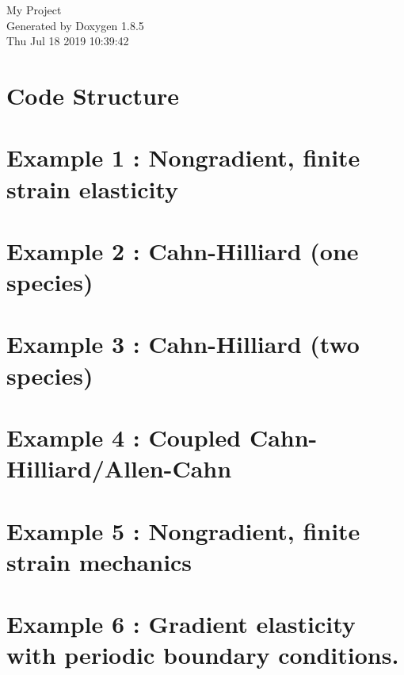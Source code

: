 \documentclass[twoside]{book}
\newcommand{\clearemptydoublepage}{%
  \newpage{\pagestyle{empty}\cleardoublepage}%
}
\begin{document}
\hypersetup{pageanchor=false}
\begin{titlepage}
\vspace*{7cm}
\begin{center}%
{\Large My Project }\\
\vspace*{1cm}
{\large Generated by Doxygen 1.8.5}\\
\vspace*{0.5cm}
{\small Thu Jul 18 2019 10:39:42}\\
\end{center}
\end{titlepage}
\clearemptydoublepage
\tableofcontents
\clearemptydoublepage
{}
\hypersetup{pageanchor=true}

\chapter{Code Structure}
\label{codestructure}
\hypertarget{codestructure}{}

\chapter{Example 1 \-: Nongradient, finite strain elasticity}
\label{example1}
\hypertarget{example1}{}

\chapter{Example 2 \-: Cahn-\/\-Hilliard (one species)}
\label{example2}
\hypertarget{example2}{}

\chapter{Example 3 \-: Cahn-\/\-Hilliard (two species)}
\label{example3}
\hypertarget{example3}{}

\chapter{Example 4 \-: Coupled Cahn-\/\-Hilliard/\-Allen-\/\-Cahn}
\label{example4}
\hypertarget{example4}{}

\chapter{Example 5 \-: Nongradient, finite strain mechanics}
\label{example5}
\hypertarget{example5}{}

\chapter{Example 6 \-: Gradient elasticity with periodic boundary conditions.}
\label{example6}
\hypertarget{example6}{}

\end{document}
